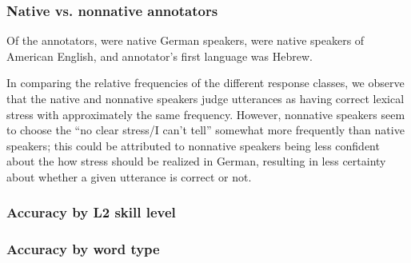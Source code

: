 	
	
		\subsubsection{Native vs. nonnative annotators}

		Of the \TODO annotators, \TODO were native German speakers,  were native speakers of American English, and  annotator's first language was Hebrew. 

		In comparing the relative frequencies of the different response classes, we observe that the native and nonnative speakers judge utterances as having correct lexical stress with approximately the same frequency. However, nonnative speakers seem to choose the ``no clear stress/I can't tell'' somewhat more frequently than native speakers; this could be attributed to nonnative speakers being less confident about the how stress should be realized in German, resulting in less certainty about whether a given utterance is correct or not. 
		
		\subsubsection{Accuracy by L2 skill level}
		
		
		
		\subsubsection{Accuracy by word type}

